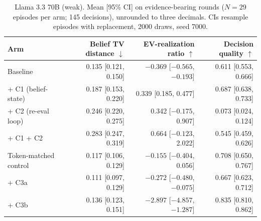 \documentclass[
  10pt,
]{article}
\begin{document}
\begin{table}[htbp]
\centering
\footnotesize
\caption{Llama 3.3 70B (weak). Mean [95\% CI] on evidence-bearing rounds ($N=29$ episodes per arm; 145 decisions), unrounded to three decimals. CIs resample episodes with replacement, 2000 draws, seed 7000.}
\label{tab:h2}
\begin{tabular}{@{}lrrr@{}}
\toprule
Arm & Belief TV distance $\downarrow$ & EV-realization ratio $\uparrow$ & Decision quality $\uparrow$ \\
\midrule
Baseline & 0.135 [0.121, 0.150] & $-0.369$ [$-0.565$, $-0.193$] & 0.611 [0.553, 0.666] \\
\;+ C1 (belief-state) & 0.187 [0.153, 0.220] & 0.339 [0.185, 0.477] & 0.687 [0.638, 0.733] \\
\;+ C2 (re-eval loop) & 0.246 [0.220, 0.275] & 0.342 [$-0.175$, 0.907] & 0.073 [0.024, 0.124] \\
\;+ C1 + C2 & 0.283 [0.247, 0.319] & 0.664 [$-0.123$, 2.022] & 0.545 [0.459, 0.626] \\
Token-matched control & 0.117 [0.106, 0.129] & $-0.155$ [$-0.404$, 0.056] & 0.708 [0.650, 0.767] \\
\;+ C3a & 0.111 [0.097, 0.129] & $-0.272$ [$-0.480$, $-0.075$] & 0.667 [0.623, 0.712] \\
\;+ C3b & 0.136 [0.123, 0.151] & $-2.897$ [$-4.857$, $-1.287$] & 0.835 [0.810, 0.862] \\
\bottomrule
\end{tabular}
\end{table}
\end{document}
